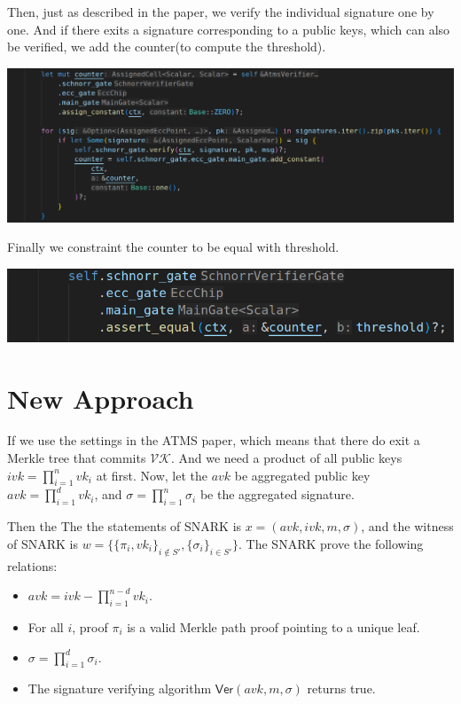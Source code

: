 \documentclass{article}
\begin{document}
Then, just as described in the paper, we verify the individual signature one by one. And if there exits a signature corresponding to a public keys, which can also be verified, we add the counter(to compute the threshold).


\vspace{0.5cm}

\includegraphics[width=1\linewidth]{inigo_atms_code_verify.png}
\vspace{0.1cm}


Finally we constraint the counter to be equal with threshold.

\vspace{0.5cm}

\includegraphics[width=1\linewidth]{inigo_atms_code_threshold.png}
\vspace{0.1cm}


\section{New Approach}


If we use the settings in the ATMS paper, which means that there do exit a Merkle tree that commits $\mathcal{VK}$. And we need a product of all public keys $ ivk = \prod_{i=1}^n vk_i$ at first. Now, let the $avk$ be aggregated public key $avk =  \prod_{i=1}^d vk_i$, and $\sigma = \prod_{i=1}^n \sigma_i$ be the aggregated signature.

Then the The the statements of SNARK is $x = (avk,ivk,m,\sigma)$, and the witness of SNARK is $w = \{\{\pi_i, vk_i\}_{i \notin S'}, \{\sigma_i\}_{i \in S'}\}$. The SNARK prove the following relations:

\begin{itemize}
    \item $avk = ivk - \prod_{i=1}^{n-d} vk_i$.
    \item For all $i$, proof $\pi_i$ is a valid Merkle path proof pointing to a unique leaf.
    \item $\sigma = \prod_{i=1}^d \sigma_i$.
    \item The signature verifying algorithm $\mathsf{Ver}(avk,m,
    \sigma)$ returns true.
\end{itemize}
\end{document}
